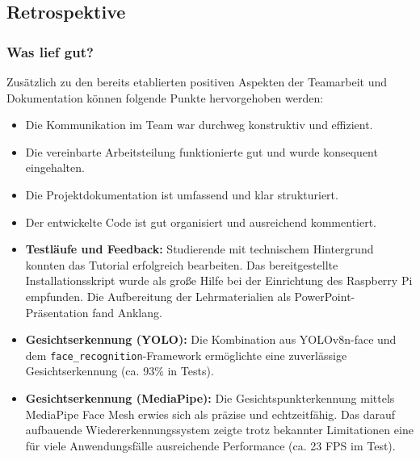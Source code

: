 \subsection{Retrospektive}

\subsubsection{Was lief gut?}
Zusätzlich zu den bereits etablierten positiven Aspekten der Teamarbeit und Dokumentation können folgende Punkte hervorgehoben werden:
\begin{itemize}
    \item Die Kommunikation im Team war durchweg konstruktiv und effizient.
    \item Die vereinbarte Arbeitsteilung funktionierte gut und wurde konsequent eingehalten.
    \item Die Projektdokumentation ist umfassend und klar strukturiert.
    \item Der entwickelte Code ist gut organisiert und ausreichend kommentiert.
    \item \textbf{Testläufe und Feedback:} Studierende mit technischem Hintergrund konnten das Tutorial erfolgreich bearbeiten. Das bereitgestellte Installationsskript wurde als große Hilfe bei der Einrichtung des Raspberry Pi empfunden. Die Aufbereitung der Lehrmaterialien als PowerPoint-Präsentation fand Anklang.
    \item \textbf{Gesichtserkennung (YOLO):} Die Kombination aus YOLOv8n-face und dem \texttt{face\_recognition}-Framework ermöglichte eine zuverlässige Gesichtserkennung (ca. 93\% in Tests).
    \item \textbf{Gesichtserkennung (MediaPipe):} Die Gesichtspunkterkennung mittels MediaPipe Face Mesh erwies sich als präzise und echtzeitfähig. Das darauf aufbauende Wiedererkennungssystem zeigte trotz bekannter Limitationen eine für viele Anwendungsfälle ausreichende Performance (ca. 23 FPS im Test).
\end{itemize}  

